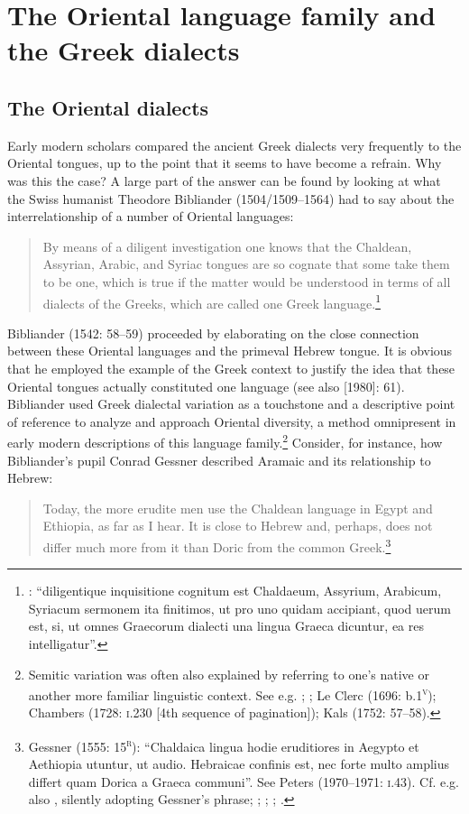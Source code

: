 \section{The Oriental language family and the Greek dialects}
\subsection{The Oriental dialects}

Early modern scholars compared the ancient Greek dialects very frequently to the Oriental tongues, up to the point that it seems to have become a refrain. Why was this the case? A large part of the answer can be found by looking at what the Swiss humanist Theodore Bibliander (1504/1509–1564) had to say about the interrelationship of a number of Oriental languages:

\begin{quote}
By means of a diligent investigation one knows that the Chaldean, Assyrian, Arabic, and Syriac tongues are so cognate that some take them to be one, which is true if the matter would be understood in terms of all dialects of the Greeks, which are called one Greek language.\footnote{\citet[58]{Bibliander1542}: “diligentique inquisitione cognitum est Chaldaeum, Assyrium, Arabicum, Syriacum sermonem ita finitimos, ut pro uno quidam accipiant, quod uerum est, si, ut omnes Graecorum dialecti una lingua Graeca dicuntur, ea res intelligatur”.}
\end{quote}

Bibliander (1542: 58–59) proceeded by elaborating on the close connection between these Oriental languages and the primeval Hebrew tongue. It is obvious that he employed the example of the Greek context to justify the idea that these Oriental tongues actually constituted one language (see also \citealt{Metcalf2013} [1980]: 61). Bibliander used Greek dialectal variation as a touchstone and a descriptive point of reference to analyze and approach Oriental diversity, a method omnipresent in early modern descriptions of this language family.\footnote{Semitic variation was often also explained by referring to one’s native or another more familiar linguistic context. See e.g. \citet[41]{Purchas1613}; \citet[197]{Kircher1679}; Le Clerc (1696: b.1\textsc{\textsuperscript{v}}); Chambers (1728: \textsc{i.}230 [4th sequence of pagination]); Kals (1752: 57–58).} Consider, for instance, how Bibliander’s pupil Conrad Gessner described Aramaic and its relationship to Hebrew:

\begin{quote}
Today, the more erudite men use the Chaldean language in Egypt and Ethiopia, as far as I hear. It is close to Hebrew and, perhaps, does not differ much more from it than Doric from the common Greek.\footnote{Gessner (1555: 15\textsc{\textsuperscript{r}}): “Chaldaica lingua hodie eruditiores in Aegypto et Aethiopia utuntur, ut audio. Hebraicae confinis est, nec forte multo amplius differt quam Dorica a Graeca communi”. See Peters (1970–1971: \textsc{i.}43). Cf. e.g. also \citet[325]{Rocca1591}, silently adopting Gessner’s phrase; \citet[459]{Saumaise1643a}; \citet[88]{Bagnati1732}; \citet[24]{Wesley1736}; \citet[22]{Eichhorn1780}.}
\end{quote}

